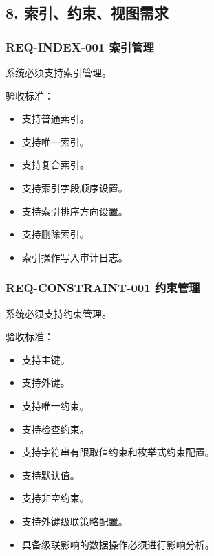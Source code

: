 \documentclass[
  a4paper,
  UTF8]{ctexart}
\providecommand{\tightlist}{%
  \setlength{\itemsep}{0pt}\setlength{\parskip}{0pt}}
\begin{document}
\hypertarget{ux7d22ux5f15ux7ea6ux675fux89c6ux56feux9700ux6c42}{%
\subsection{8.
索引、约束、视图需求}\label{ux7d22ux5f15ux7ea6ux675fux89c6ux56feux9700ux6c42}}

\hypertarget{req-index-001-ux7d22ux5f15ux7ba1ux7406}{%
\subsubsection{REQ-INDEX-001
索引管理}\label{req-index-001-ux7d22ux5f15ux7ba1ux7406}}

系统必须支持索引管理。

验收标准：

\begin{itemize}
\tightlist
\item
  支持普通索引。
\item
  支持唯一索引。
\item
  支持复合索引。
\item
  支持索引字段顺序设置。
\item
  支持索引排序方向设置。
\item
  支持删除索引。
\item
  索引操作写入审计日志。
\end{itemize}

\hypertarget{req-constraint-001-ux7ea6ux675fux7ba1ux7406}{%
\subsubsection{REQ-CONSTRAINT-001
约束管理}\label{req-constraint-001-ux7ea6ux675fux7ba1ux7406}}

系统必须支持约束管理。

验收标准：

\begin{itemize}
\tightlist
\item
  支持主键。
\item
  支持外键。
\item
  支持唯一约束。
\item
  支持检查约束。
\item
  支持字符串有限取值约束和枚举式约束配置。
\item
  支持默认值。
\item
  支持非空约束。
\item
  支持外键级联策略配置。
\item
  具备级联影响的数据操作必须进行影响分析。
\end{itemize}
\end{document}
